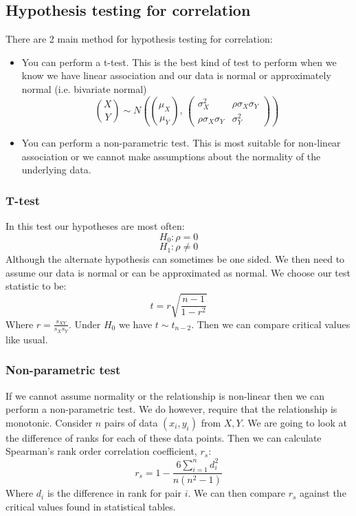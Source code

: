 \documentclass[12pt]{article}
\begin{document}
\subsection*{Hypothesis testing for correlation}
There are 2 main method for hypothesis testing for correlation:
\begin{itemize}
    \item You can perform a t-test. This is the best kind of test to perform when we know we have linear association and our data is normal or approximately normal (i.e. bivariate normal)
    \[\binom{X}{Y}\sim N\left(\binom{\mu_X}{\mu_Y},\,\begin{pmatrix}
        \sigma_X^2 & \rho\sigma_X\sigma_Y \\
        \rho\sigma_X\sigma_Y & \sigma_Y^2
    \end{pmatrix}\right)\]
    \item You can perform a non-parametric test. This is most suitable for non-linear association or we cannot make assumptions about the normality of the underlying data.
\end{itemize}
\subsubsection*{T-test}
In this test our hypotheses are most often:
\[H_0: \rho=0\]
\[H_1: \rho \ne 0\]
Although the alternate hypothesis can sometimes be one sided. We then need to assume our data is normal or can be approximated as normal. We choose our test statistic to be:
\[t=r\sqrt{\frac{n-1}{1-r^2}}\]
Where \(r=\frac{s_{XY}}{s_{X}s_{Y}}\). Under \(H_0\) we have \(t\sim t_{n-2}\). Then we can compare critical values like usual.
\subsubsection*{Non-parametric test}
If we cannot assume normality or the relationship is non-linear then we can perform a non-parametric test. We do however, require that the relationship is monotonic. Consider \(n\) pairs of data \((x_i,y_i)\) from \(X,Y\). We are going to look at the difference of ranks for each of these data points. Then we can calculate Spearman's rank order correlation coefficient, \(r_s\):
\[r_s=1-\frac{6\sum^n_{i=1}d_i^2}{n(n^2-1)}\]
Where \(d_i\) is the difference in rank for pair \(i\). We can then compare \(r_s\) against the critical values found in statistical tables.
\end{document}
